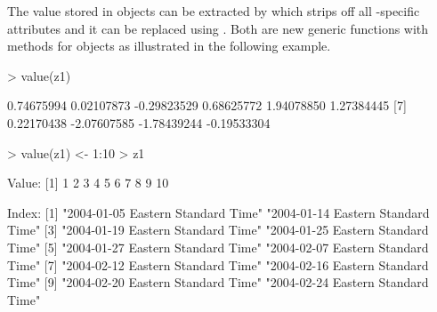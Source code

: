 \documentclass{Z}
\begin{document}
The value stored in  objects can be extracted by
 which strips off all -specific attributes and 
it can be replaced using . Both are new generic functions
with methods for  objects as illustrated in the following
example.
\begin{Schunk}
\begin{Sinput}
> value(z1)
\end{Sinput}
\begin{Soutput}
 [1]  0.74675994  0.02107873 -0.29823529  0.68625772  1.94078850  1.27384445
 [7]  0.22170438 -2.07607585 -1.78439244 -0.19533304
\end{Soutput}
\begin{Sinput}
> value(z1) <- 1:10
> z1
\end{Sinput}
\begin{Soutput}
Value:
 [1]  1  2  3  4  5  6  7  8  9 10

Index:
 [1] "2004-01-05 Eastern Standard Time" "2004-01-14 Eastern Standard Time"
 [3] "2004-01-19 Eastern Standard Time" "2004-01-25 Eastern Standard Time"
 [5] "2004-01-27 Eastern Standard Time" "2004-02-07 Eastern Standard Time"
 [7] "2004-02-12 Eastern Standard Time" "2004-02-16 Eastern Standard Time"
 [9] "2004-02-20 Eastern Standard Time" "2004-02-24 Eastern Standard Time"
\end{Soutput}
\end{Schunk}
\end{document}
